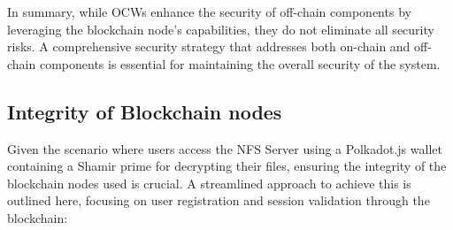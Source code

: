 \documentclass{tufte-handout}
\begin{document}
In summary, while OCWs enhance the security of off-chain components by leveraging the blockchain node's capabilities, they do not eliminate all security risks.
A comprehensive security strategy that addresses both on-chain and off-chain components is essential for maintaining the overall security of the system.

\subsection{Integrity of Blockchain nodes}\label{sec:headings}
Given the scenario where users access the NFS Server using a Polkadot.js wallet containing a Shamir prime for decrypting their files, ensuring the integrity
of the blockchain nodes used is crucial. A streamlined approach to achieve this is outlined here, focusing on user registration and session validation through
the blockchain:
\end{document}

